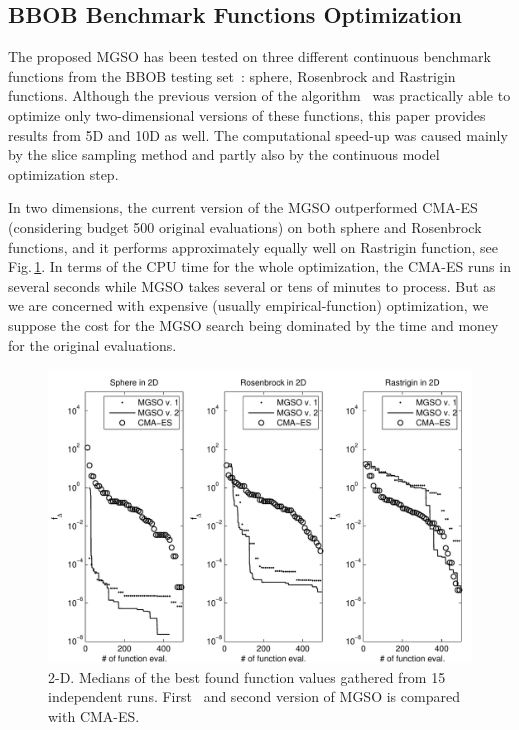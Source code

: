 \documentclass{itatnew}
\begin{document}
\subsection{BBOB Benchmark Functions Optimization}

The proposed MGSO has been tested on three different continuous benchmark functions from the BBOB testing set~\cite{hansen_real_2009}: sphere, Rosenbrock and Rastrigin functions. Although the previous version of the algorithm~\cite{bajer_model_2013} was practically able to optimize only two-dimensional versions of these functions, this paper provides results from 5D and 10D as well. The computational speed-up was caused mainly by the slice sampling method and partly also by the continuous model optimization step. %

In two dimensions, the current version of the MGSO outperformed CMA-ES (considering budget 500 original evaluations) on both sphere and Rosenbrock functions, and it performs approximately equally well on Rastrigin function, see Fig.\,\ref{fig:optim_2D}. In terms of the CPU time for the whole optimization, the CMA-ES runs in several seconds while MGSO takes several or tens of minutes to process. But as we are concerned with expensive (usually empirical-function) optimization, we suppose the cost for the MGSO search being dominated by the time and money for the original evaluations.


\begin{figure}
  \centering
  \includegraphics[width=\linewidth]{optim_2D}
  {\small
    \caption{2-D. Medians of the best found function values gathered from 15 independent runs. First~\cite{bajer_model_2013} and second version of MGSO is compared with CMA-ES.
  \label{fig:optim_2D}
  }
  }
\end{figure}
\end{document}
